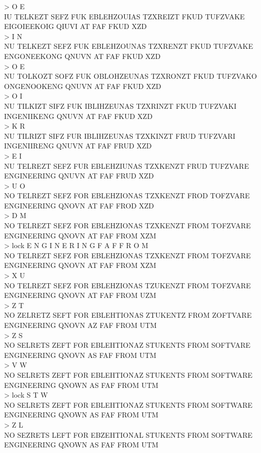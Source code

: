\documentclass[12pt]{article}
\begin{document}
> O E\\
IU TELKEZT SEFZ FUK EBLEHZOUIAS TZXREIZT FKUD TUFZVAKE EIGOIEEKOIG QIUVI AT FAF FKUD XZD\\
> I N\\
NU TELKEZT SEFZ FUK EBLEHZOUNAS TZXRENZT FKUD TUFZVAKE ENGONEEKONG QNUVN AT FAF FKUD XZD\\
> O E\\
NU TOLKOZT SOFZ FUK OBLOHZEUNAS TZXRONZT FKUD TUFZVAKO ONGENOOKENG QNUVN AT FAF FKUD XZD\\
> O I\\
NU TILKIZT SIFZ FUK IBLIHZEUNAS TZXRINZT FKUD TUFZVAKI INGENIIKENG QNUVN AT FAF FKUD XZD\\
> K R\\
NU TILRIZT SIFZ FUR IBLIHZEUNAS TZXKINZT FRUD TUFZVARI INGENIIRENG QNUVN AT FAF FRUD XZD\\
> E I\\
NU TELREZT SEFZ FUR EBLEHZIUNAS TZXKENZT FRUD TUFZVARE ENGINEERING QNUVN AT FAF FRUD XZD\\
> U O\\
NO TELREZT SEFZ FOR EBLEHZIONAS TZXKENZT FROD TOFZVARE ENGINEERING QNOVN AT FAF FROD XZD\\
> D M\\
NO TELREZT SEFZ FOR EBLEHZIONAS TZXKENZT FROM TOFZVARE ENGINEERING QNOVN AT FAF FROM XZM\\
> lock E N G I N E R I N G F A F F R O M\\
NO TELREZT SEFZ FOR EBLEHZIONAS TZXKENZT FROM TOFZVARE ENGINEERING QNOVN AT FAF FROM XZM\\
> X U\\
NO TELREZT SEFZ FOR EBLEHZIONAS TZUKENZT FROM TOFZVARE ENGINEERING QNOVN AT FAF FROM UZM\\
> Z T\\
NO ZELRETZ SEFT FOR EBLEHTIONAS ZTUKENTZ FROM ZOFTVARE ENGINEERING QNOVN AZ FAF FROM UTM\\
> Z S\\
NO SELRETS ZEFT FOR EBLEHTIONAZ STUKENTS FROM SOFTVARE ENGINEERING QNOVN AS FAF FROM UTM\\
> V W\\
NO SELRETS ZEFT FOR EBLEHTIONAZ STUKENTS FROM SOFTWARE ENGINEERING QNOWN AS FAF FROM UTM\\
> lock S T W\\
NO SELRETS ZEFT FOR EBLEHTIONAZ STUKENTS FROM SOFTWARE ENGINEERING QNOWN AS FAF FROM UTM\\
> Z L\\
NO SEZRETS LEFT FOR EBZEHTIONAL STUKENTS FROM SOFTWARE ENGINEERING QNOWN AS FAF FROM UTM\\
\end{document}
